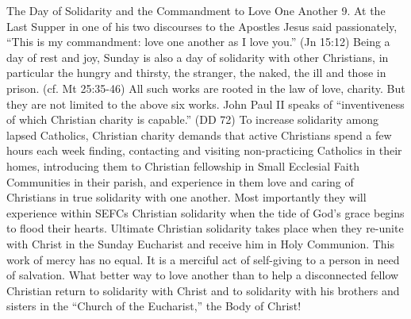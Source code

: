 \documentclass[oneside]{book}
\begin{document}
The Day of Solidarity and the Commandment to Love One Another
9. At the Last Supper in one of his two discourses to the Apostles Jesus said
passionately, ``This is my commandment: love one another as I love you.'' (Jn
15:12) Being a day of rest and joy, Sunday is also a day of solidarity with
other Christians, in particular the hungry and thirsty, the stranger, the naked,
the ill and those in prison. (cf. Mt 25:35-46) All such works are rooted in the
law of love, charity. But they are not limited to the above six works.
John Paul II speaks of ``inventiveness of which Christian charity is capable.''
(DD 72) To increase solidarity among lapsed Catholics, Christian charity demands
that active Christians spend a few hours each week finding, contacting and
visiting non-practicing Catholics in their homes, introducing them to Christian
fellowship in Small Ecclesial Faith Communities in their parish, and experience
in them love and caring of Christians in true solidarity with one another. Most
importantly they will experience within SEFCs Christian solidarity when the tide
of God's grace begins to flood their hearts.
Ultimate Christian solidarity takes place when they re-unite with Christ in the
Sunday Eucharist and receive him in Holy Communion. This work of mercy has no
equal. It is a merciful act of self-giving to a person in need of
salvation. What better way to love another than to help a disconnected fellow
Christian return to solidarity with Christ and to solidarity with his brothers
and sisters in the ``Church of the Eucharist,'' the Body of Christ!
\end{document}
